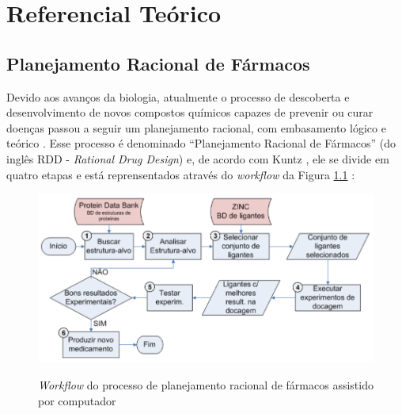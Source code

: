 \chapter{Referencial Teórico}

\section{Planejamento Racional de Fármacos}
Devido aos avanços da biologia, atualmente o processo de descoberta e desenvolvimento de novos compostos químicos capazes de prevenir ou curar doenças passou a seguir um planejamento racional, com embasamento lógico e teórico \cite{rdd}. Esse processo é denominado “Planejamento Racional de Fármacos” (do inglês RDD - \emph{Rational Drug Design}) e, de acordo com Kuntz \cite{kun92}, ele se divide em quatro etapas e está reprensentados através do \emph{workflow} da Figura \ref{fig:rddworkflow} \cite{kar11}: 

\begin{figure}[h]
	\center
	\includegraphics[width=14cm]{images/rdd_workflow.png}
	\label{fig:rddworkflow}
	\caption{\emph{Workflow} do processo de planejamento racional de fármacos assistido por computador \cite{kar11}}
\end{figure}


